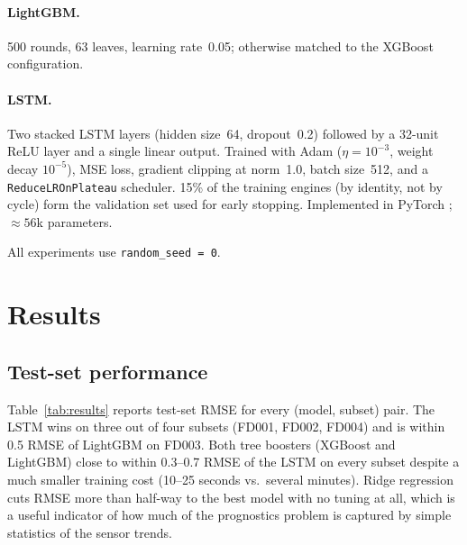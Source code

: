 \documentclass[11pt,letterpaper]{article}
\begin{document}
\paragraph{LightGBM.} 500 rounds, 63 leaves, learning rate~0.05;
otherwise matched to the XGBoost configuration.

\paragraph{LSTM.} Two stacked LSTM layers (hidden size~64, dropout~0.2)
followed by a 32-unit ReLU layer and a single linear output. Trained
with Adam ($\eta = 10^{-3}$, weight decay $10^{-5}$), MSE loss,
gradient clipping at norm~1.0, batch size~512, and a
\texttt{ReduceLROnPlateau} scheduler. 15\% of the training engines (by
identity, not by cycle) form the validation set used for early
stopping. Implemented in PyTorch \citep{paszke2019pytorch};
$\approx 56$k parameters.

All experiments use \texttt{random\_seed = 0}.

\section{Results}\label{sec:results}
\subsection{Test-set performance}
Table~\ref{tab:results} reports test-set RMSE for every (model, subset) pair. 
The LSTM wins on three out of four subsets (FD001, FD002, FD004) and is within
0.5 RMSE of LightGBM on FD003. Both tree boosters (XGBoost and
LightGBM) close to within 0.3--0.7 RMSE of the LSTM on every subset
despite a much smaller training cost (10--25 seconds vs.\ several
minutes). Ridge regression cuts RMSE more than half-way to the best
model with no tuning at all, which is a useful indicator of how much of
the prognostics problem is captured by simple statistics of the
sensor trends.
\end{document}
